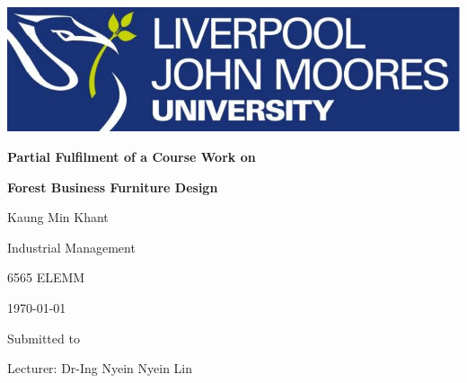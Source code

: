\begin{titlepage}
    \thispagestyle{titlepage}
    \begin{flushleft}
        \includegraphics[scale=0.2]{liverpool.png}
    \end{flushleft}

    \vspace{0.5in}
    \begin{center}
        \textbf{Partial Fulfilment of a Course Work on}
        
        \vspace{0.5in}

        \textbf{Forest Business Furniture Design}

        \vspace{0.5in}
        Kaung Min Khant

        \vspace{0.2in}
        Industrial Management

        \vspace{0.2in}
        6565 ELEMM

        \vspace{0.2in}
        \today

        \vspace{0.5in}
        Submitted to

        \vspace{0.2in}
        Lecturer: Dr-Ing Nyein Nyein Lin
    \end{center}
    
    \vspace{1in}
\end{titlepage}